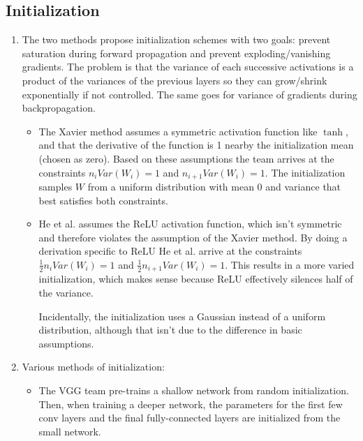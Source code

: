 \documentclass[a4paper]{article}
\begin{document}
\setcounter{section}{2}
\setcounter{subsection}{2}

\subsection{Initialization}

\begin{enumerate}

\item The two methods propose initialization schemes with two goals: prevent saturation during forward propagation and prevent exploding/vanishing gradients. The problem is that the variance of each successive activations is a product of the variances of the previous layers so they can grow/shrink exponentially if not controlled. The same goes for variance of gradients during backpropagation.

\begin{itemize}
\item The Xavier method \cite{glorot2010understanding} assumes a symmetric activation function like $\tanh$, and that the derivative of the function is 1 nearby the initialization mean (chosen as zero). Based on these assumptions the team arrives at the constraints $n_i Var (W_i) = 1$ and $n_{i+1} Var (W_i) = 1$. The initialization samples $W$ from a uniform distribution with mean 0 and variance that best satisfies both constraints.

\item He et al. \cite{he2015delving} assumes the ReLU activation function,  which isn't symmetric and therefore violates the assumption of the Xavier method. By doing a derivation specific to ReLU He et al. arrive at the constraints $\frac{1}{2} n_i Var(W_i) = 1$ and $\frac{1}{2} n_{i+1} Var(W_i) = 1$. This results in a more varied initialization, which makes sense because ReLU effectively silences half of the variance.

Incidentally, the initialization uses a Gaussian instead of a uniform distribution, although that isn't due to the difference in basic assumptions.

\end{itemize}

\item Various methods of initialization:
\begin{itemize}

\item The VGG team \cite{simonyan2014very} pre-trains a shallow network from random initialization. Then, when training a deeper network, the parameters for the first few conv layers and the final fully-connected layers are initialized from the small network.


\end{itemize}
\end{enumerate}
\end{document}
